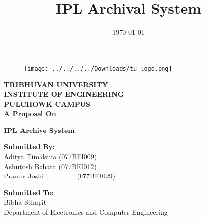 \documentclass[titlepage]{article}
\title{\textbf{IPL Archival System}}
\author{}
\date{\today}
\begin{document}
\begin{titlepage}

 
    
    \begin{figure}[H]
        \centering
        \texttt{[image: ../../../../Downloads/tu\_logo.png]}
    \end{figure}
    
    \begin{center}
        \textbf{\large TRIBHUVAN UNIVERSITY}\\
        \vspace*{2mm}
        \textbf{\large INSTITUTE OF ENGINEERING}\\
        \vspace*{2mm}
        \textbf{\large PULCHOWK CAMPUS}\\
        \vspace*{5mm}
        \textbf{\large A Proposal On}
    \end{center}
    
\vspace*{0.37\textheight}

\begin{center}
    \textbf{\large IPL Archive System}
\end{center}
\vspace*{5mm}

\thispagestyle{empty}
\setlength{\columnsep}{110pt}
\begin{multicols*}{2}
    \noindent
    \textbf{\underline{Submitted By:}}\\
    Aditya Timalsina (077BEI009)\\
    Ashutosh Bohara (077BEI012)\\
    Pranav Joshi \ \ \ \  \ \ \ \ \ (077BEI029)
    
    \noindent
    \textbf{\underline{Submitted To:}}\\
    Bibha Sthapit\\
    Department of Electronics and Computer Engineering
    
    
\end{multicols*}

\clearpage
\end{titlepage}
\end{document}
